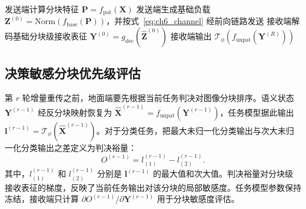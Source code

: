 \begin{algorithm}[!htp]
\caption{接收端驱动的 CIS-R 多轮收发流程}
\label{algo:ch6_cis}
发送端计算分块特征 $\mathbf P=f_{\mathrm{pat}}(\mathbf X)$\;
发送端生成基础负载 $\mathbf Z^{(0)}=\mathrm{Norm}(f_{\mathrm{base}}(\mathbf P))$，并按式~\eqref{eq:ch6_channel} 经前向链路发送\;
接收端解码基础分块级接收表征 $\mathbf Y^{(0)}=g_{\mathrm{dec}}(\hat{\mathbf Z}^{(0)})$\;
接收端输出 $\mathcal T_\phi(f_{\mathrm{unpat}}(\mathbf Y^{(R)}))$\;
\end{algorithm}

\subsection{决策敏感分块优先级评估}
\label{subsec:ch6_feedback}

第 $r$ 轮增量重传之前，地面端要先根据当前任务判决对图像分块排序。语义状态 $\mathbf Y^{(r-1)}$ 经反分块映射恢复为 $\hat{\mathbf X}^{(r-1)}=f_{\mathrm{unpat}}(\mathbf Y^{(r-1)})$，任务模型据此输出 $\mathbf l^{(r-1)}=\mathcal T_\phi(\hat{\mathbf X}^{(r-1)})$。对于分类任务，把最大未归一化分类输出与次大未归一化分类输出之差定义为判决裕量：
\begin{equation}\label{eq:ch6_margin}
O^{(r-1)}=l_{(1)}^{(r-1)}-l_{(2)}^{(r-1)}.
\end{equation}
其中，$l_{(1)}^{(r-1)}$ 和 $l_{(2)}^{(r-1)}$ 分别是 $\mathbf l^{(r-1)}$ 的最大值和次大值。判决裕量对分块级接收表征的梯度，反映了当前任务输出对该分块的局部敏感度。任务模型参数保持冻结，接收端只计算 $\partial O^{(r-1)}/\partial\mathbf Y^{(r-1)}$ 用于分块敏感度评估。

